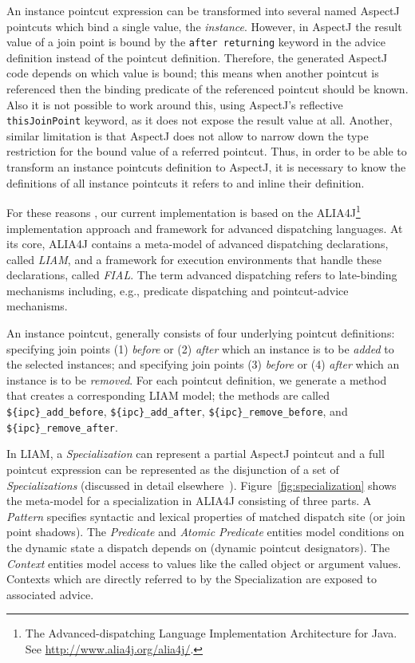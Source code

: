 \documentclass{acm_proc_article-sp}
\newcommand{\lstinln}[1]{\lstinline~#1~}
\begin{document}
An instance pointcut expression can be transformed into several named AspectJ pointcuts which bind a single value, the \emph{instance}.
However, in AspectJ the result value of a join point is bound by the \lstinln{after returning} keyword in the advice definition instead of the pointcut definition.
Therefore, the generated AspectJ code depends on which value is bound; this means when another pointcut is referenced then the binding predicate of the referenced pointcut should be known.
Also it is not possible to work around this, using AspectJ's reflective \lstinln{thisJoinPoint} keyword, as it does not expose the result value at all.
Another, similar limitation is that AspectJ does not allow to narrow down the type restriction for the bound value of a referred pointcut.
Thus, in order to be able to transform an instance pointcuts definition to AspectJ, it is necessary to know the definitions of all instance pointcuts it refers to and inline their definition.

For these reasons , our current implementation is based on the ALIA4J\footnote{The Advanced-dispatching Language Implementation Architecture for Java. See \url{http://www.alia4j.org/alia4j/}.}~\cite{Bockisch2012,Bockisch2011} implementation approach and framework for advanced dispatching languages.
At its core, ALIA4J contains a meta-model of advanced dispatching declarations, called \emph{LIAM}, and a framework for execution environments that handle these declarations, called \emph{FIAL}.
The term advanced dispatching refers to late-binding mechanisms including, e.g., predicate dispatching and pointcut-advice mechanisms.

An instance pointcut, generally consists of four underlying pointcut definitions: specifying join points (1) \emph{before} or (2) \emph{after} which an instance is to be \emph{added} to the selected instances; and specifying join points (3) \emph{before} or (4) \emph{after} which an instance is to be \emph{removed}.
For each pointcut definition, we generate a method that creates a corresponding LIAM model; the methods are called \lstinline!${ipc}_add_before!, \lstinline!${ipc}_add_after!, \lstinline!${ipc}_remove_before!, and \lstinline!${ipc}_remove_after!.

In LIAM, a \emph{Specialization} can represent a partial AspectJ pointcut and a full pointcut expression can be represented as the disjunction of a set of \emph{Specializations} (discussed in detail elsewhere~\cite{Bockisch2007}). 
Figure~\ref{fig:specialization} shows the meta-model for a specialization in ALIA4J consisting of three parts.
A \emph{Pattern} specifies syntactic and lexical properties of matched dispatch site (or join point shadows).
The \emph{Predicate} and \emph{Atomic Predicate} entities model conditions on the dynamic state a dispatch depends on (dynamic pointcut designators).
The \emph{Context} entities model access to values like the called object or argument values.
Contexts which are directly referred to by the Specialization are exposed to associated advice.
\end{document}
